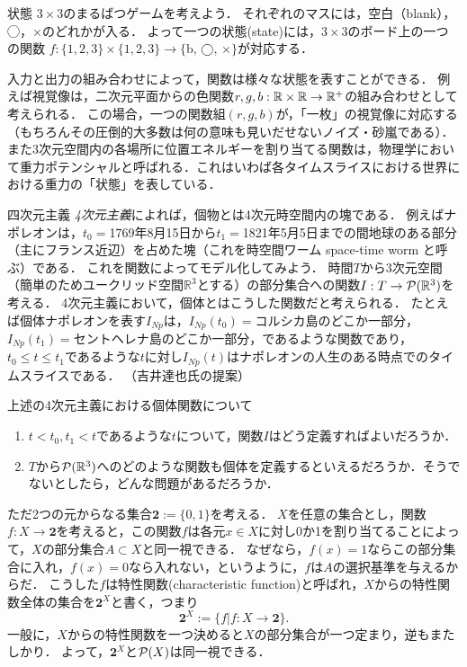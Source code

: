 \documentclass[11pt,a4paper]{bxjsarticle}
\begin{document}
\begin{rei}{状態}{}
$3 \times 3$のまるばつゲームを考えよう．
それぞれのマスには，空白（blank），◯，×のどれかが入る．
よって一つの状態(state)には，$3 \times 3$のボード上の一つの関数 $f:\{1, 2, 3\} \times \{1, 2, 3\} \to \{ \text{b, ◯, ×}\}$が対応する．

入力と出力の組み合わせによって，関数は様々な状態を表すことができる．
例えば視覚像は，二次元平面からの色関数$r, g, b:\mathbb{R} \times \mathbb{R} \to \mathbb{R}^+$の組み合わせとして考えられる．
この場合，一つの関数組$(r,g,b)$が，「一枚」の視覚像に対応する（もちろんその圧倒的大多数は何の意味も見いだせないノイズ・砂嵐である）．
また3次元空間内の各場所に位置エネルギーを割り当てる関数は，物理学において重力ポテンシャルと呼ばれる．これはいわば各タイムスライスにおける世界における重力の「状態」を表している．
\end{rei}



\begin{rei}{四次元主義}{}
\emph{4次元主義}によれば，個物とは4次元時空間内の塊である．
例えばナポレオンは，$t_0=$1769年8月15日から$t_1=$1821年5月5日までの間地球のある部分（主にフランス近辺）を占めた塊（これを時空間ワーム space-time worm と呼ぶ）である．
これを関数によってモデル化してみよう．
時間$T$から3次元空間（簡単のためユークリッド空間$\mathbb{R}^3$とする）の部分集合への関数$I:T \to \mathcal{P}(\mathbb{R}^3)$を考える．
4次元主義において，個体とはこうした関数だと考えられる．
たとえば個体ナポレオンを表す$I_{Np}$は，$I_{Np}(t_0)=$コルシカ島のどこか一部分，$I_{Np}(t_1)=$セントヘレナ島のどこか一部分，であるような関数であり，$t_0 \leq t \leq t_1$であるような$t$に対し$I_{Np}(t)$はナポレオンの人生のある時点でのタイムスライスである．
（吉井達也氏の提案）
\end{rei}

\begin{renshu}{}{}
上述の4次元主義における個体関数について
 \begin{enumerate}
  \item $t < t_0, t_1 < t$であるような$t$について，関数$I$はどう定義すればよいだろうか．
  \item $T$から$\mathcal{P}(\mathbb{R}^3)$へのどのような関数も個体を定義するといえるだろうか．そうでないとしたら，どんな問題があるだろうか．
 \end{enumerate}
\end{renshu}


\begin{hatten}{}{}
ただ2つの元からなる集合$\mathbf{2} := \{0, 1\}$を考える．
$X$を任意の集合とし，関数$f:X \to \mathbf{2}$を考えると，この関数$f$は各元$x \in X$に対し0か1を割り当てることによって，$X$の部分集合$A \subset X$と同一視できる．
なぜなら，$f(x)=1$ならこの部分集合に入れ，$f(x)=0$なら入れない，というように，$f$は$A$の選択基準を与えるからだ．
こうした$f$は特性関数(characteristic function)と呼ばれ，$X$からの特性関数全体の集合を$\mathbf{2}^X$と書く，つまり
\[
 \mathbf{2}^X := \{ f|f:X \to \mathbf{2}\}.
\]
一般に，$X$からの特性関数を一つ決めると$X$の部分集合が一つ定まり，逆もまたしかり．
よって，$\mathbf{2}^X$と$\mathcal{P}(X)$は同一視できる．
\end{hatten}
\end{document}
